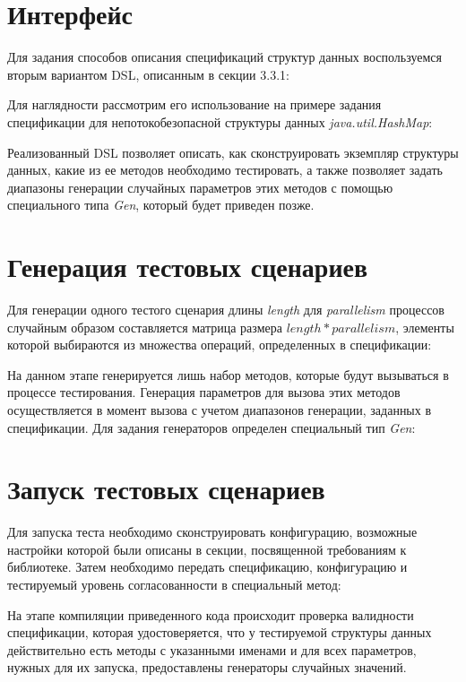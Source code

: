 \documentclass[14pt, openany]{book}
\begin{document}
\section{Интерфейс}
Для задания способов описания спецификаций структур данных воспользуемся вторым вариантом DSL, описанным в секции 3.3.1:

Для наглядности рассмотрим его использование на примере задания спецификации для непотокобезопасной структуры данных
\textit{java.util.HashMap}:

Реализованный DSL позволяет описать, как сконструировать экземпляр структуры данных, какие из ее методов необходимо тестировать, а также позволяет задать диапазоны генерации случайных параметров этих методов с помощью специального типа
\textit{Gen}, который будет приведен позже.

\section{Генерация тестовых сценариев}
Для генерации одного тестого сценария длины \textit{length} для \textit{parallelism} процессов
случайным образом составляется матрица размера \(length * parallelism\), элементы которой выбираются из множества операций, определенных в спецификации:


На данном этапе генерируется лишь набор методов, которые будут вызываться в процессе тестирования. Генерация параметров для вызова этих методов осуществляется в момент вызова с учетом диапазонов генерации, заданных в спецификации. Для задания генераторов определен специальный тип \textit{Gen}:


\section{Запуск тестовых сценариев}

Для запуска теста необходимо сконструировать конфигурацию, возможные настройки которой были описаны в секции, посвященной требованиям к библиотеке. Затем необходимо передать спецификацию, конфигурацию и тестируемый уровень согласованности в специальный метод:
\newline

На этапе компиляции приведенного кода происходит проверка валидности спецификации, которая удостоверяется, что у тестируемой структуры данных действительно есть методы с указанными именами и для всех параметров, нужных для их запуска, предоставлены генераторы случайных значений.
\end{document}
